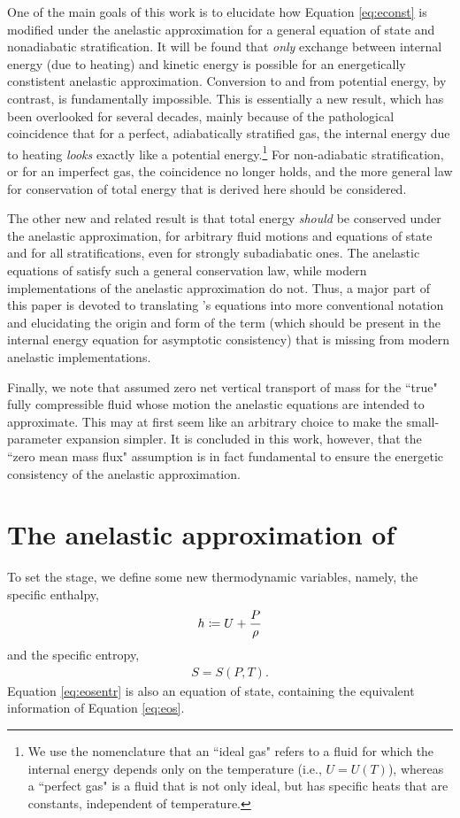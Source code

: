 \documentclass[12pt]{article}
\begin{document}
	One of the main goals of this work is to elucidate how Equation \eqref{eq:econst} is modified under the anelastic approximation for a general equation of state and nonadiabatic stratification. It will be found that \textit{only} exchange between internal energy (due to heating) and kinetic energy is possible for an energetically constistent anelastic approximation. Conversion to and from potential energy, by contrast, is fundamentally impossible. This is essentially a new result, which has been overlooked for several decades, mainly because of the pathological coincidence that for a perfect, adiabatically stratified gas, the internal energy due to heating \textit{looks} exactly like a potential energy.\footnote{We use the nomenclature that an ``ideal gas" refers to a fluid for which the internal energy depends only on the temperature (i.e., $U=U(T)$), whereas a ``perfect gas" is a fluid that is not only ideal, but has specific heats that are constants, independent of temperature.} For non-adiabatic stratification, or for an imperfect gas, the coincidence no longer holds, and the more general law for conservation of total energy that is derived here should be considered. 
	
The other new and related result is that total energy \textit{should} be conserved under the anelastic approximation, for arbitrary fluid motions and equations of state and for all stratifications, even for strongly subadiabatic ones. The anelastic equations of \citet{Gough1969} satisfy such a general conservation law, while modern implementations of the anelastic approximation do not. Thus, a major part of this paper is devoted to translating \citet{Gough1969}'s equations into more conventional notation and elucidating the origin and form of the term (which should be present in the internal energy equation for asymptotic consistency) that is missing from modern anelastic implementations. 

Finally, we note that \citet{Gough1969} assumed zero net vertical transport of mass for the ``true" fully compressible fluid whose motion the anelastic equations are intended to approximate. This may at first seem like an arbitrary choice to make the small-parameter expansion simpler. It is concluded in this work, however, that the ``zero mean mass flux" assumption is in fact fundamental to ensure the energetic consistency of the anelastic approximation. 

	\section{The anelastic approximation of \citet{Gough1969}}
	To set the stage, we define some new thermodynamic variables, namely, the specific enthalpy,
\begin{align}\label{eq:enthalpy}
	h\coloneqq U + \frac{P}{\rho}
\end{align}
and the specific entropy,
\begin{align}\label{eq:eosentr}
	S = S(P,T).
\end{align}
Equation \eqref{eq:eosentr} is also an equation of state, containing the equivalent information of Equation \eqref{eq:eos}. 
\end{document}
